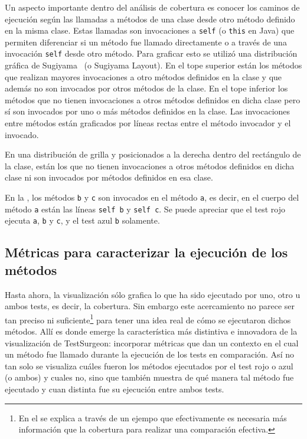 \par Un aspecto importante dentro del análisis de cobertura es conocer los caminos de ejecución según las llamadas a métodos de una clase desde otro método definido en la misma clase. Estas llamadas son invocaciones a {\tt self} (o {\tt this} en Java) que permiten diferenciar si un método fue llamado directamente o a través de una invocación {\tt self} desde otro método. Para graficar esto se utilizó una distribución gráfica de Sugiyama~\cite{sugiyama1981methods} (o Sugiyama Layout). En el tope superior están los métodos que realizan mayores invocaciones a otro métodos definidos en la clase y que además no son invocados por otros métodos de la clase. En el tope inferior los métodos que no tienen invocaciones a otros métodos definidos en dicha clase pero sí son invocados por uno o más métodos definidos en la clase. Las invocaciones entre métodos están graficados por líneas rectas entre el método invocador y el invocado.

\par En una distribución de grilla y posicionados a la derecha dentro del rectángulo de la clase, están los que no tienen invocaciones a otros métodos definidos en dicha clase ni son invocados por métodos definidos en esa clase.


\par En la , los métodos {\tt b} y {\tt c} son invocados en el método {\tt a}, es decir, en el cuerpo del método {\tt a} están las líneas {\tt self b} y {\tt self c}. Se puede apreciar que el test rojo ejecuta {\tt a}, {\tt b} y {\tt c}, y el test azul {\tt b} solamente. 

\subsection{Métricas para caracterizar la ejecución de los métodos }

\par Hasta ahora, la visualización sólo grafica lo que ha sido ejecutado por uno, otro u ambos tests, es decir, la cobertura. Sin embargo este acercamiento no parece ser tan preciso ni suficiente\footnote{En el  se explica a través de un ejempo que efectivamente es necesaria más información que la cobertura para realizar una comparación efectiva.} para tener una idea real de cómo se ejecutaron dichos métodos. Allí es donde emerge la característica más distintiva e innovadora de la visualización de TestSurgeon: incorporar métricas que dan un contexto en el cual un método fue llamado durante la ejecución de los tests en comparación. Así no tan solo se visualiza cuáles fueron los métodos ejecutados por el test rojo o azul (o ambos) y cuales no, sino que también muestra de qué manera tal método fue ejecutado y cuan distinta fue su ejecución entre ambos tests.

